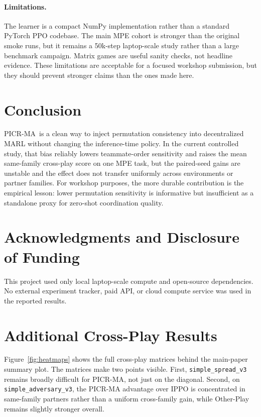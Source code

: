 \documentclass{article}
\newcommand{\method}{PICR-MA}
\begin{document}
\paragraph{Limitations.}
The learner is a compact NumPy implementation rather than a standard PyTorch PPO codebase. The main MPE cohort is stronger than the original smoke runs, but it remains a 50k-step laptop-scale study rather than a large benchmark campaign. Matrix games are useful sanity checks, not headline evidence. These limitations are acceptable for a focused workshop submission, but they should prevent stronger claims than the ones made here.

\section{Conclusion}
\method\ is a clean way to inject permutation consistency into decentralized MARL without changing the inference-time policy. In the current controlled study, that bias reliably lowers teammate-order sensitivity and raises the mean same-family cross-play score on one MPE task, but the paired-seed gains are unstable and the effect does not transfer uniformly across environments or partner families. For workshop purposes, the more durable contribution is the empirical lesson: lower permutation sensitivity is informative but insufficient as a standalone proxy for zero-shot coordination quality.

\section*{Acknowledgments and Disclosure of Funding}
This project used only local laptop-scale compute and open-source dependencies. No external experiment tracker, paid API, or cloud compute service was used in the reported results.




\appendix

\section{Additional Cross-Play Results}
Figure~\ref{fig:heatmaps} shows the full cross-play matrices behind the main-paper summary plot. The matrices make two points visible. First, \texttt{simple\_spread\_v3} remains broadly difficult for PICR-MA, not just on the diagonal. Second, on \texttt{simple\_adversary\_v3}, the PICR-MA advantage over IPPO is concentrated in same-family partners rather than a uniform cross-family gain, while Other-Play remains slightly stronger overall.
\end{document}
